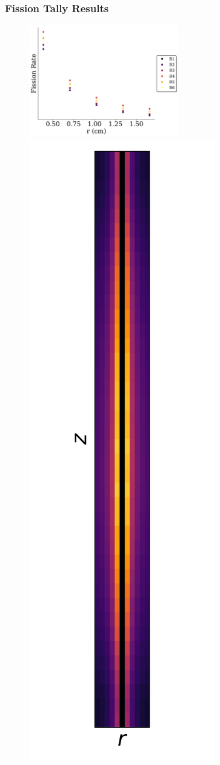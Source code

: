 \documentclass[fleqn]{beamer}
\begin{document}
\begin{frame}
\frametitle{Fission Tally Results}

\begin{figure}
\centering
\includegraphics[width = 0.58\textwidth]{radial_rr_density_B}
\includegraphics[height = 0.8\textheight]{rr_dist_B1}

\end{figure}
\end{frame}
\end{document}
